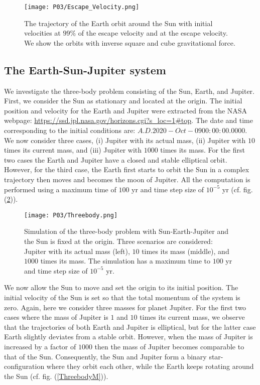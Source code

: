 \documentclass[a4paper]{article}
\begin{document}
\begin{figure}
  \centering
  \texttt{[image: P03/Escape\_Velocity.png]}
  \caption{The trajectory of the Earth orbit around the Sun with initial velocities at $99 \%$ of the escape velocity and at the escape velocity. We show the orbits with inverse square and cube gravitational force.}
   \label{Escape_Velocity}
\end{figure}

\subsection{The Earth-Sun-Jupiter system}
We investigate the three-body problem consisting of the Sun, Earth, and Jupiter. First, we consider the Sun as stationary and located at the origin. The initial position and velocity for the Earth and Jupiter were extracted from the NASA webpage: \url{https://ssd.jpl.nasa.gov/horizons.cgi?s_loc=1#top}. The date and time corresponding to the initial conditions are: $A.D. 2020-Oct-09 00:00:00.0000$. We now consider three cases, (i) Jupiter with its actual mass, (ii) Jupiter with $10$ times its current mass, and (iii) Jupiter with $1000$ times its mass. For the first two cases the Earth and Jupiter have a closed and stable elliptical orbit. However, for the third case, the Earth first starts to orbit the Sun in a complex trajectory then moves and becomes the moon of Jupiter. All the computation is performed using a maximum time of $100$ yr and time step size of $10^{-5}$ yr (cf. fig. (\ref{Threebody})).

\begin{figure}
  \centering
  \texttt{[image: P03/Threebody.png]}
  \caption{Simulation of the three-body problem with Sun-Earth-Jupiter and the Sun is fixed at the origin. Three scenarios are considered: Jupiter with its actual mass (left), $10$ times its mass (middle), and $1000$ times its mass. The simulation has a maximum time to $100$ yr and time step size of $10^{-5}$ yr.}
   \label{Threebody}
\end{figure}

We now allow the Sun to move and set the origin to its initial position. The initial velocity of the Sun is set so that the total momentum of the system is zero. Again, here we consider three masses for planet Jupiter. For the first two cases where the mass of Jupiter is $1$ and $10$ times its current mass, we observe that the trajectories of both Earth and Jupiter is elliptical, but for the latter case Earth slightly deviates from a stable orbit. However, when the mass of Jupiter is increased by a factor of $1000$ then the mass of Jupiter becomes comparable to that of the Sun. Consequently, the Sun and Jupiter form a binary star-configuration where they orbit each other, while the Earth keeps rotating around the Sun (cf. fig. (\ref{ThreebodyM})). 
\end{document}

